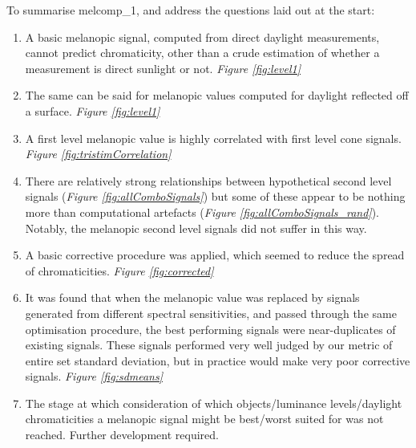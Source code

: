 To summarise melcomp\_1, and address the questions laid out at the start:
\begin{enumerate}
    \item A basic melanopic signal, computed from direct daylight measurements, cannot predict chromaticity, other than a crude estimation of whether a measurement is direct sunlight or not. \emph{Figure \ref{fig:level1}}
    \item The same can be said for melanopic values computed for daylight reflected off a surface. \emph{Figure \ref{fig:level1}}
    \item A first level melanopic value is highly correlated with first level cone signals. \emph{Figure \ref{fig:tristimCorrelation}}
    \item There are relatively strong relationships between hypothetical second level signals (\emph{Figure \ref{fig:allComboSignals}}) but some of these appear to be nothing more than computational artefacts (\emph{Figure \ref{fig:allComboSignals_rand}}). Notably, the melanopic second level signals did not suffer in this way.
    \item A basic corrective procedure was applied, which seemed to reduce the spread of chromaticities. \emph{Figure \ref{fig:corrected}} 
    \item It was found that when the melanopic value was replaced by signals generated from different spectral sensitivities, and passed through the same optimisation procedure, the best performing signals were near-duplicates of existing signals. These signals performed very well judged by our metric of entire set standard deviation, but in practice would make very poor corrective signals. \emph{Figure \ref{fig:sdmeans}}
    \item The stage at which consideration of which objects/luminance levels/daylight chromaticities a melanopic signal might be best/worst suited for was not reached. Further development required.
\end{enumerate}
